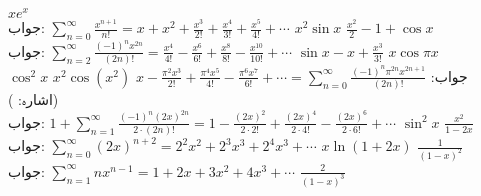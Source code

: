 $xe^x$\\
جواب:\quad
$\sum\limits_{n=0}^{\infty}\tfrac{x^{n+1}}{n!}=x+x^2+\tfrac{x^3}{2!}+\tfrac{x^4}{3!}+\tfrac{x^5}{4!}+\cdots$
$x^2\sin x$
$\tfrac{x^2}{2}-1+\cos x$\\
جواب:\quad
$\sum\limits_{n=2}^{\infty}\tfrac{(-1)^nx^{2n}}{(2n)!}=\tfrac{x^4}{4!}-\tfrac{x^6}{6!}+\tfrac{x^8}{8!}-\tfrac{x^{10}}{10!}+\cdots$
$\sin x-x+\tfrac{x^3}{3!}$
$x\cos \pi x$\\
جواب:\quad
$x-\tfrac{\pi^2x^3}{2!}+\tfrac{\pi^4x^5}{4!}-\tfrac{\pi^6x^7}{6!}+\cdots=\sum\limits_{n=0}^{\infty}\tfrac{(-1)^n\pi^{2n}x^{2n+1}}{(2n)!}$
$x^2\cos (x^2)$
$\cos^2 x$\quad
(اشارہ: )\\
جواب:\quad
$1+\sum\limits_{n=1}^{\infty}\tfrac{(-1)^n(2x)^{2n}}{2\cdot(2n)!}=1-\tfrac{(2x)^2}{2\cdot 2!}+\tfrac{(2x)^4}{2\cdot 4!}-\tfrac{(2x)^6}{2\cdot 6!}+\cdots$
$\sin^2x$
$\tfrac{x^2}{1-2x}$\\
جواب:\quad
$\sum\limits_{n=0}^{\infty}(2x)^{n+2}=2^2x^2+2^3x^3+2^4x^3+\cdots$
$x\ln (1+2x)$
$\tfrac{1}{(1-x)^2}$\\
جواب:\quad
$\sum\limits_{n=1}^{\infty}nx^{n-1}=1+2x+3x^2+4x^3+\cdots$
$\tfrac{2}{(1-x)^3}$
\\


